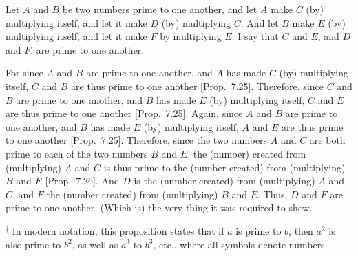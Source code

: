 \begin{Parallel}{}{}
{\epsfysize=2in
\centerline{}

Let $A$ and $B$ be two numbers prime to one another, and let $A$ make
$C$ (by) multiplying itself, and let it make $D$ (by) multiplying $C$. 
And let $B$ make $E$ (by) multiplying itself, and let it make $F$ by multiplying $E$.
I say that $C$ and $E$, and $D$ and $F$, are prime to one another.

For since $A$ and $B$ are prime to one another, and $A$ has made $C$ (by)
multiplying itself, $C$ and $B$ are thus prime to one another [Prop.~7.25]. Therefore, since
$C$ and $B$ are prime to one another, and $B$ has made $E$ (by) multiplying itself,
$C$ and $E$ are thus prime to one another [Prop.~7.25].  Again, since $A$ and $B$ are prime to
one another, and $B$ has made $E$ (by) multiplying itself, $A$ and $E$ are thus
prime to one another [Prop.~7.25]. Therefore,
since the two numbers $A$ and $C$ are both prime to each of the two numbers
$B$ and $E$, the (number) created from (multiplying) $A$ and $C$ is thus
prime to the (number created) from (multiplying) $B$ and $E$ [Prop.~7.26]. And $D$ is the (number created)
from (multiplying) $A$ and $C$, and $F$ the (number created) from (multiplying)
$B$ and $E$. Thus, $D$ and $F$ are prime to one another. (Which is) the 
very thing it
was required to show.}
\end{Parallel}
{\footnotesize\noindent$^\dag$ In modern notation, this proposition
states that if $a$ is prime to $b$, then $a^2$ is also prime to $b^2$,
as well as $a^3$ to $b^3$, etc., where all symbols denote numbers.}

